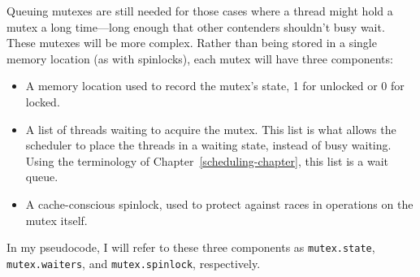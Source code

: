 Queuing mutexes are still needed for those cases where a
thread might hold a mutex a long time---long enough that other
contenders shouldn't busy wait.  These mutexes will be more complex.
Rather than being stored in a single memory location (as with
spinlocks), each mutex will have three components:
\begin{itemize}
\item
A memory location used to record the mutex's state, 1 for unlocked or
0 for locked.
\item
A list of threads waiting to acquire the mutex.  This list is what
allows the scheduler to place the threads in a waiting state, instead
of busy waiting.  Using the terminology of
Chapter~\ref{scheduling-chapter}, this list is a wait queue.
\item
A cache-conscious spinlock, used to protect against races in
operations on the mutex itself.
\end{itemize}
In my pseudocode, I will refer to these three components as
\verb|mutex.state|, \verb|mutex.waiters|, and \verb|mutex.spinlock|,
respectively.

